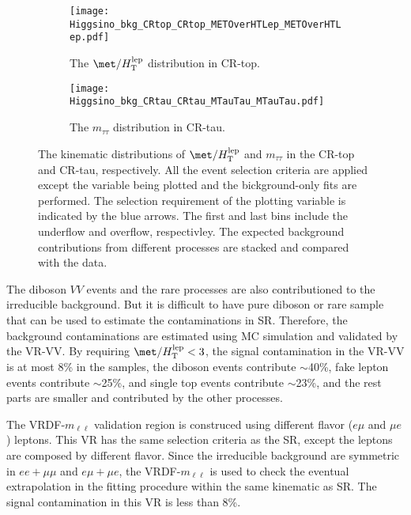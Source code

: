 \begin{figure}[ht]
    \begin{center}
        \begin{subfigure}[b]{0.48\textwidth}
            \texttt{[image: Higgsino\_bkg\_CRtop\_CRtop\_METOverHTLep\_METOverHTLep.pdf]}
            \caption{The $\met/H_\mathrm{T}^\mathrm{lep}$ distribution in CR-top.}
            \label{fig:bkg_kinematic_metOverHT_CRtop}
        \end{subfigure}
        \begin{subfigure}[b]{0.48\textwidth}
            \texttt{[image: Higgsino\_bkg\_CRtau\_CRtau\_MTauTau\_MTauTau.pdf]}
            \caption{The $m_{\tau \tau}$ distribution in CR-tau.}
            \label{fig:bkg_kinematic_mtautau_CRtau}
        \end{subfigure}
        \caption{The kinematic distributions of $\met/H_\mathrm{T}^\mathrm{lep}$ and $m_{\tau \tau}$ in the CR-top and CR-tau, respectively.
        All the event selection criteria are applied except the variable being plotted and the bickground-only fits are performed.
        The selection requirement of the plotting variable is indicated by the blue arrows.
        The first and last bins include the underflow and overflow, respectivley.
        The expected background contributions from different processes are stacked and compared with the data.}
        \label{fig:bkg_kinematic_distributions_in_CRs}
    \end{center}
\end{figure}

The diboson $VV$ events and the rare processes are also contributioned to the irreducible background.
But it is difficult to have pure diboson or rare sample that can be used to estimate the contaminations in SR.
Therefore, the background contaminations are estimated using MC simulation and validated by the VR-VV.
By requiring $\met/H_\mathrm{T}^\mathrm{lep} < 3$, the signal contamination in the VR-VV is at most 8\% in the samples, the diboson events contribute $\sim$40\%, fake lepton events contribute $\sim$25\%, \ttbar and single top events contribute $\sim$23\%, and the rest parts are smaller and contributed by the other processes.

The VRDF-$m_{\ell \ell}$ validation region is construced using different flavor ($e\mu$ and $\mu e$) leptons.
This VR has the same selection criteria as the SR, except the leptons are composed by different flavor.
Since the irreducible background are symmetric in $ee+\mu\mu$ and $e\mu+\mu e$, the VRDF-$m_{\ell \ell}$ is used to check the eventual extrapolation in the fitting procedure within the same kinematic as SR.
The signal contamination in this VR is less than 8\%.

